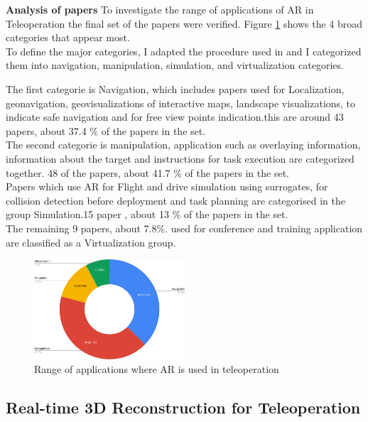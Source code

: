\textbf{Analysis of papers}
 To investigate the range of applications of AR in Teleoperation the final set of the papers were verified. Figure \ref{fig:range of applications} shows the 4 broad categories that appear most.\\
 
 To define the  major categories, I adapted the procedure used in \cite{7912316} and I categorized them into navigation, manipulation, simulation, and virtualization categories.
 
 The first categorie is Navigation, which includes papers used for Localization, geonavigation, geovisualizations of interactive maps, landscape visualizations, to indicate safe navigation and for free view points indication.this are around 43 papers, about 37.4 $\%$ of the papers in the set.\\
 
 The second categorie is manipulation, application such as overlaying information, information about the target and instructions for task execution are categorized together. 48 of the papers, about 41.7 $\%$ of the papers in the set.\\
 
 Papers which use AR for Flight and drive simulation using surrogates, for collision detection before deployment and task planning are categorised in the group Simulation.15 paper , about 13 $\%$ of the papers in the set.\\
 
 The remaining 9 papers, about 7.8$\%$. used for conference and training application are classified as a Virtualization group.
 
 
\begin{figure}[h]
    \centering
    \includegraphics[width=0.5\textwidth]{images/chart.png}
    \caption{Range of applications where AR is used in teleoperation}
    \label{fig:range of applications}
\end{figure}

\subsection{Real-time 3D Reconstruction for Teleoperation}




